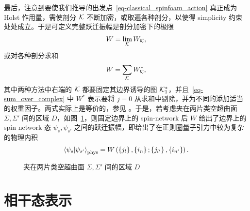 			最后，注意到要使我们推导的出发点~\eqref{eq-classical_spinfoam_action} 真正成为 Holst 作用量，需使剖分 $\mathcal{K}$ 不断加密，或取遍各种剖分，以使得 simplicity 约束处处成立。于是可定义完整跃迁振幅是剖分加密下的极限
			\begin{equation}
				W = \lim_{\mathcal{K}} W_{\mathcal{K}},\label{eq-continuous_limit}
			\end{equation}
			或对各种剖分求和
			\begin{equation}
				W = \sum_{\mathcal{K}} W^*_{\mathcal{K}},\label{eq-sum_over_complex}
			\end{equation}
			其中两种方法中右端的 $\mathcal{K}$ 都要固定其边界诱导的图 $\mathcal{K}^*_1$，并且~\eqref{eq-sum_over_complex} 中 $W^*$ 表示要将 $j=0$ 从求和中剔除，并为不同的添加适当的权重因子。两式实际上是等价的，参见 \cite{Rovelli:2010qx}。于是，若考虑夹在两片类空超曲面 $\Sigma,\Sigma'$ 间的区域 $D$，如图~\ref{pic-D}，则固定边界上的 spin-network 后 $W$ 给出了边界上的 spin-network 态 $\psi_s,\psi_{s'}$ 之间的跃迁振幅，即给出了在正则圈量子引力中较为复杂的物理内积
			\begin{equation}
				\ip{\psi_s}{\psi_{s'}}_{\text{phys}} = W\left(\left\{ j_l \right\},\left\{ i_n \right\};\left\{ j_{l'}\right\},\left\{ i_{n'} \right\}\right).
			\end{equation}
			\begin{figure}[htbp!]
				\centering
				\caption{夹在两片类空超曲面 $\Sigma,\Sigma'$ 间的区域 $D$}\label{pic-D}
			\end{figure}

		\section{相干态表示}

